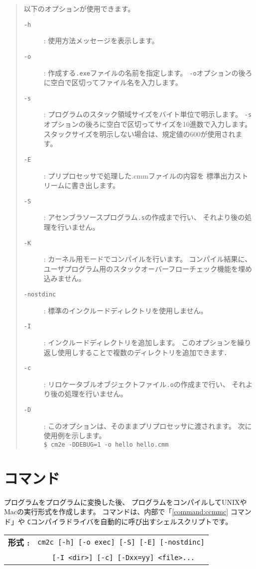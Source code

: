 \begin{quote}
\hspace{-1em}以下のオプションが使用できます。

\begin{description}
\item[{\tt -h}] : 使用方法メッセージを表示します。
\item[{\tt -o}] : 作成する{\tt .exe}ファイルの名前を指定します。
{\tt -o}オプションの後ろに空白で区切ってファイル名を入力します。
\item[{\tt -s}] : プログラムのスタック領域サイズをバイト単位で明示します。
{\tt -s}オプションの後ろに空白で区切ってサイズを10進数で入力します。
スタックサイズを明示しない場合は、規定値の600が使用されます。
\item[{\tt -E}] : プリプロセッサで処理した{.cmm}ファイルの内容を
標準出力ストリームに書き出します。
\item[{\tt -S}] : アセンブラソースプログラム{\tt .s}の作成まで行い、
それより後の処理を行いません。
\item[{\tt -K}] : {\tacos}カーネル用モードでコンパイルを行います。
コンパイル結果に、
ユーザプログラム用のスタックオーバーフローチェック機能を埋め込みません。
\item[{\tt -nostdinc}] : 標準のインクルードディレクトリを使用しません。
\item[{\tt -I}] : インクルードディレクトリを追加します。
このオプションを繰り返し使用しすることで複数のディレクトリを追加できます．
\item[{\tt -c}] : リロケータブルオブジェクトファイル{\tt .o}の作成まで行い、
それより後の処理を行いません。
\item[{\tt -D}] : このオプションは、そのままプリプロセッサに渡されます。
次に使用例を示します。\\
\verb/$ cm2e -DDEBUG=1 -o hello hello.cmm/
\end{description}
\end{quote}

\section{{\cmc}コマンド}

{\cmm}プログラムを{\cl}プログラムに変換した後、
{\cl}プログラムをコンパイルしてUNIXやMacの実行形式を作成します。
{\cmc}コマンドは、内部で「\ref{command:ccmmc} {\ccmmc}コマンド」や
{\tt C}コンパイラドライバを自動的に呼び出すシェルスクリプトです。

\begin{flushleft}
\begin{tabular}{l l}
{\bf 形式 : } & \verb/cm2c [-h] [-o exec] [-S] [-E] [-nostdinc]/\\
              & ~~~ \verb/[-I <dir>] [-c] [-Dxx=yy] <file>.../
\end{tabular}
\end{flushleft}

